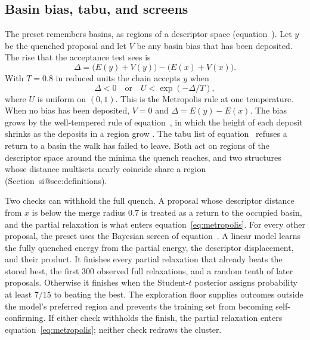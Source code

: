 \documentclass[journal=jctcce,manuscript=article]{achemso}
\makeatletter
\newcommand{\siref}[1]{\csname si@#1\endcsname}
\makeatother
\begin{document}
\subsection{Basin bias, tabu, and screens}
\label{sec:accept}
The preset remembers basins, as regions of a descriptor space
(equation~).
Let \(y\) be the quenched proposal and let \(V\) be any basin bias that
has been deposited.
The rise that the acceptance test sees is
\begin{equation}
\Delta = \bigl(E(y)+V(y)\bigr) - \bigl(E(x)+V(x)\bigr).
\label{eq:delta}
\end{equation}
With \(T=0.8\) in reduced units the chain accepts \(y\) when
\begin{equation}
\Delta < 0
\quad\text{or}\quad
U < \exp(-\Delta/T),
\label{eq:metropolis}
\end{equation}
where \(U\) is uniform on \((0,1)\).
This is the Metropolis rule at one temperature.
\cite{wales1997}
When no bias has been deposited, \(V=0\) and \(\Delta=E(y)-E(x)\).
The bias grows by the well-tempered rule of equation~, in
which the height of each deposit shrinks as the deposits in a region grow
\cite{Barducci_Bussi_Parrinello_2008}.
The tabu list of equation~ refuses a return to a basin the walk
has failed to leave.
Both act on regions of the descriptor space around the minima the quench
reaches, and two structures whose distance multisets nearly coincide share a
region (Section~\siref{sec:definitions}).

Two checks can withhold the full quench.
A proposal whose descriptor distance from \(x\) is below the merge
radius \(0.7\) is treated as a return to the occupied basin, and the
partial relaxation is what enters equation~\ref{eq:metropolis}.
For every other proposal, the preset uses the Bayesian screen of
equation~.
A linear model learns the fully quenched energy from the partial energy,
the descriptor displacement, and their product.
It finishes every partial relaxation that already beats the stored best,
the first 300 observed full relaxations, and a random tenth of later
proposals.
Otherwise it finishes when the Student-\(t\) posterior assigns probability
at least \(7/15\) to beating the best.
The exploration floor supplies outcomes outside the model's preferred
region and prevents the training set from becoming self-confirming.
If either check withholds the finish, the partial relaxation enters
equation~\ref{eq:metropolis}; neither check redraws the cluster.
\end{document}
